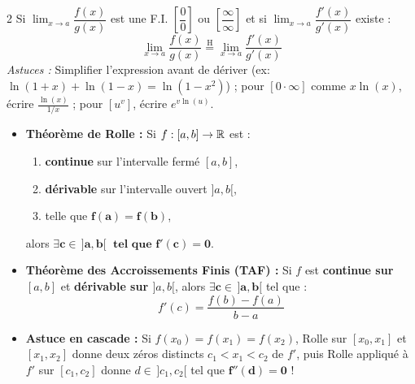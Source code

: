 {\begin{multicols}{2}
\vspace{2pt}
Si $\lim_{x \to a} \dfrac{f(x)}{g(x)}$ est une F.I. $\left[\dfrac{0}{0}\right]$ ou $\left[\dfrac{\infty}{\infty}\right]$ et si $\lim_{x \to a} \dfrac{f'(x)}{g'(x)}$ existe :
\[
    \boxed{\lim_{x \to a} \frac{f(x)}{g(x)} \stackrel{\text{H}}{=} \lim_{x \to a} \frac{f'(x)}{g'(x)}}
\]
\emph{Astuces :} Simplifier l'expression avant de dériver (ex: $\ln(1+x)+\ln(1-x) = \ln(1-x^2)$) ; pour $[0\cdot\infty]$ comme $x\ln(x)$, écrire $\frac{\ln(x)}{1/x}$ ; pour $[u^v]$, écrire $e^{v\ln(u)}$.

\columnbreak

\begin{itemize}[leftmargin=1.2em, itemsep=1.2pt, topsep=1.5pt]
    \item \textbf{Théorème de Rolle :} Si $f : [a, b] \to \mathbb{R}$ est :
    \begin{enumerate}[leftmargin=1.5em, itemsep=0.5pt, topsep=0.5pt]
        \item \textbf{continue} sur l'intervalle fermé $[a, b]$,
        \item \textbf{dérivable} sur l'intervalle ouvert $]a, b[$,
        \item telle que $\mathbf{f(a) = f(b)}$,
    \end{enumerate}
    alors $\mathbf{\exists c \in \,]a, b[\; \text{ tel que } f'(c) = 0}$.
    \item \textbf{Théorème des Accroissements Finis (TAF) :} Si $f$ est \textbf{continue sur $[a, b]$} et \textbf{dérivable sur $]a, b[$}, alors $\mathbf{\exists c \in \,]a, b[}$ tel que :
    \[
        \boxed{f'(c) = \frac{f(b) - f(a)}{b - a}}
    \]
    \item \textbf{Astuce en cascade :} Si $f(x_0) = f(x_1) = f(x_2)$, Rolle sur $[x_0, x_1]$ et $[x_1, x_2]$ donne deux zéros distincts $c_1 < x_1 < c_2$ de $f'$, puis Rolle appliqué à $f'$ sur $[c_1, c_2]$ donne $d \in \,]c_1, c_2[$ tel que $\mathbf{f''(d) = 0}$ !
\end{itemize}


\end{multicols}}
